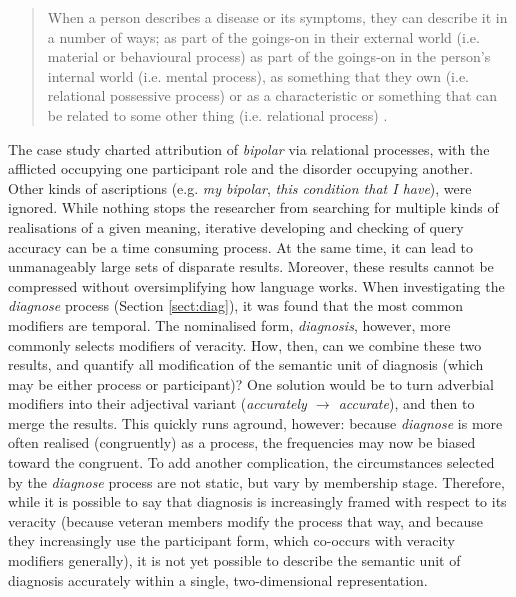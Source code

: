 \begin{quote} \small \singlespacing
When a person describes a disease or its symptoms, they can describe it in a number of ways; as part of the goings\hyp{}on in their external world (i.e. material or behavioural process) as part of the goings\hyp{}on in the person's internal world (i.e. mental process), as something that they own (i.e. relational possessive process) or as a characteristic or something that can be related to some other thing (i.e. relational process) \parencite*[p.~290]{slade_emergency_2008}.
\end{quote}
%
The case study charted attribution of \emph{bipolar} via relational processes, with the afflicted occupying one participant role and the disorder occupying another. Other kinds of ascriptions (e.g. \emph{my bipolar}, \emph{this condition that I have}), were ignored. While nothing stops the researcher from searching for multiple kinds of realisations of a given meaning, iterative developing and checking of query accuracy can be a time consuming process. At the same time, it can lead to unmanageably large sets of disparate results. Moreover, these results cannot be compressed without oversimplifying how language works. When investigating the \emph{diagnose} process (Section \ref{sect:diag}), it was found that the most common modifiers are temporal. The nominalised form, \emph{diagnosis}, however, more commonly selects modifiers of veracity. How, then, can we combine these two results, and quantify all modification of the semantic unit of diagnosis (which may be either process or participant)? One solution would be to turn adverbial modifiers into their adjectival variant (\emph{accurately $\rightarrow$ accurate}), and then to merge the results. This quickly runs aground, however: because \emph{diagnose} is more often realised (congruently) as a process, the frequencies may now be biased toward the congruent. To add another complication, the circumstances selected by the \emph{diagnose} process are not static, but vary by membership stage. Therefore, while it is possible to say that diagnosis is increasingly framed with respect to its veracity (because veteran \glspl{member} modify the process that way, and because they increasingly use the participant form, which co\hyp{}occurs with veracity modifiers generally), it is not yet possible to describe the semantic unit of diagnosis accurately within a single, two\hyp{}dimensional representation.

